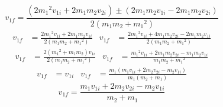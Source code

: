 \documentclass{article}
\begin{document}
\begin{equation*}
    v_{1f} = \frac{(2{m_1}^2v_{1i}+2m_1m_2v_{2i})\pm (2m_1m_2v_{1i}-2m_1m_2v_{2i})}{2(m_1m_2+{m_1}^2)}
\end{equation*}
\begin{align*}
    v_{1f} &= \frac{2{m_1}^2v_{1i}+2m_1m_2v_{1i}}{2(m_1m_2+{m_1}^2)}&
    v_{1f} &= \frac{2{m_1}^2v_{1i}+4m_1m_2v_{2i}-2m_1m_2v_{1i}}{2(m_1m_2+{m_1}^2)}
\end{align*}
\begin{align*}
    v_{1f} &= \frac{2({m_1}^2+m_1m_2)v_{1i}}{2(m_1m_2+{m_1}^2)}&
    v_{1f} &= \frac{{m_1}^2v_{1i}+2m_1m_2v_{2i}-m_1m_2v_{1i}}{m_1m_2+{m_1}^2}
\end{align*}
\begin{align*}
    v_{1f} &= v_{1i}&
    v_{1f} &= \frac{m_1(m_1v_{1i}+2m_2v_{2i}-m_2v_{1i})}{m_1(m_2+m_1)}
\end{align*}
\begin{equation*}
    v_{1f} = \frac{m_1v_{1i}+2m_2v_{2i}-m_2v_{1i}}{m_2+m_1}\tag{4}
\end{equation*}
\end{document}
